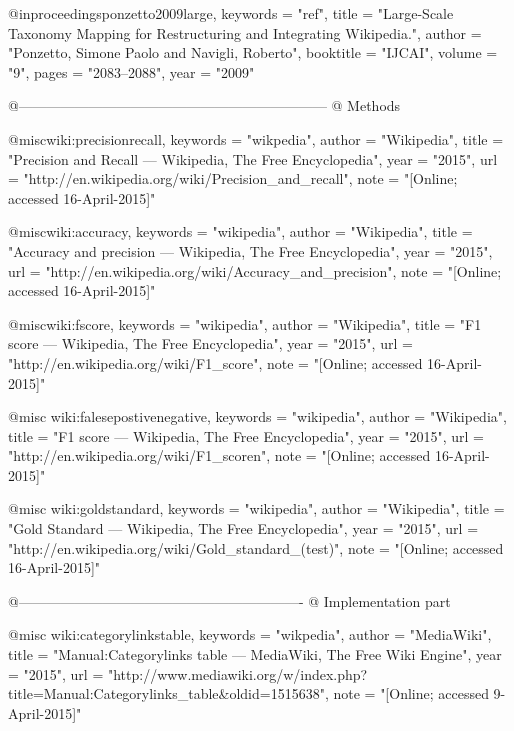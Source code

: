 @inproceedings{ponzetto2009large,
    keywords    =   "ref",
    title       =   "Large-Scale Taxonomy Mapping for Restructuring and Integrating Wikipedia.",
    author      =   "Ponzetto, Simone Paolo and Navigli, Roberto",
    booktitle   =   "IJCAI",
    volume      =   "9",
    pages       =   "2083--2088",
    year        =   "2009"
}

@------------------------------------------------------------------
@ Methods

@misc{wiki:precisionrecall,
    keywords    =   "wikpedia",
    author      =   "Wikipedia",
    title       =   "Precision and Recall --- Wikipedia{,} The Free Encyclopedia",
    year        =   "2015",
    url         =   "http://en.wikipedia.org/wiki/Precision_and_recall",
    note        =   "[Online; accessed 16-April-2015]"
}


@misc{wiki:accuracy,
    keywords    =   "wikipedia",
    author      =   "Wikipedia",
    title       =   "Accuracy and precision --- Wikipedia{,} The Free Encyclopedia",
    year        =   "2015",
    url         =   "http://en.wikipedia.org/wiki/Accuracy_and_precision",
    note        =   "[Online; accessed 16-April-2015]"
}


@misc{wiki:fscore,
    keywords    =   "wikipedia",
    author      = "Wikipedia",
    title       = "F1 score --- Wikipedia{,} The Free Encyclopedia",
    year        = "2015",
    url         = "http://en.wikipedia.org/wiki/F1_score",
    note        = "[Online; accessed 16-April-2015]"
}

@misc{ wiki:falesepostivenegative,
    keywords    =   "wikipedia",
    author = "Wikipedia",
    title = "F1 score --- Wikipedia{,} The Free Encyclopedia",
    year = "2015",
    url = "http://en.wikipedia.org/wiki/F1_scoren",
    note = "[Online; accessed 16-April-2015]"
}

@misc{ wiki:goldstandard,
    keywords    =   "wikipedia",
    author      =   "Wikipedia",
    title       =   "Gold Standard --- Wikipedia{,} The Free Encyclopedia",
    year        =   "2015",
    url         =   "http://en.wikipedia.org/wiki/Gold_standard_(test)",
    note        =   "[Online; accessed 16-April-2015]"
}
 



@-------------------------------------------------------------
@ Implementation part

@misc{ wiki:categorylinkstable,
    keywords    =   "wikpedia",
    author      =   "MediaWiki",
    title       =   "Manual:Categorylinks table --- MediaWiki{,} The Free Wiki Engine",
    year        =   "2015",
    url         =   "http://www.mediawiki.org/w/index.php?title=Manual:Categorylinks_table&oldid=1515638",
    note        =   "[Online; accessed 9-April-2015]"
}

